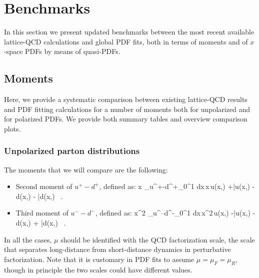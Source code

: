 \section{Benchmarks}
\label{sec:benchmarking}

In this section we present updated benchmarks between the most
recent available lattice-QCD calculations and global PDF fits,
both in terms of moments and of $x$-space PDFs by means of
quasi-PDFs.

\subsection{Moments}

Here, we provide a systematic comparison between existing
lattice-QCD results and PDF fitting calculations
for a number of moments both for unpolarized
and for polarized PDFs.
%
We provide both summary tables and overview comparison plots.

\subsubsection{Unpolarized parton distributions}

The moments that we will compare are the following:

\begin{itemize}

\item Second moment of $u^+-d^+$, defined as:
  \be
  \la x \ra_{u^+-d^+}\equiv \int_0^1 dx\,x\,\lc u(x,\mu)
  +\bar{u}(x,\mu)
-d(x,\mu) - \bar{d}(x,\mu) \, .
  \rc
  \ee

\item Third moment of $u^--d^-$, defined as:
  \be
  \la x^2 \ra_{u^--d^-}\equiv \int_0^1 dx\,x^2\,\lc u(x,\mu)
  -\bar{u}(x,\mu)
-d(x,\mu) + \bar{d}(x,\mu) \, .
  \rc
  \ee

  \end{itemize}

In all the cases, $\mu$ should be identified with the QCD
factorization scale, the scale that separates
long-distance from short-distance dynamics in perturbative
factorization.
%
Note that it is customary in PDF fits to assume
$\mu=\mu_F=\mu_R$, though in principle the two scales
could have different values.

